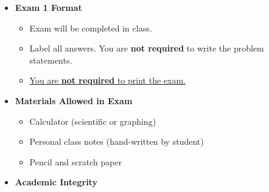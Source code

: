 \documentclass[11pt]{article}
\newcommand{\EXAMNUM}{1\hspace{0mm}}
\begin{document}
\begin{itemize}
             	\item  \textbf{\Large Exam \EXAMNUM \hspace{1mm} Format}
\begin{itemize}
		
			\item Exam will be completed in class.
			
			\item Label all answers. You are {\bf not required} to write the problem statements.
			\item \underline{You are {\bf not required} to print the exam.}
\end{itemize}


\vspace{5mm}		

		\item  \textbf{ Materials Allowed in Exam}

	\begin{itemize}

		\item  Calculator (scientific or graphing)
	
		\item  Personal class notes (hand-written by student)
			
		\item  Pencil and scratch paper
			
	\end{itemize}

\newpage
		\item  \textbf{ \Large Academic Integrity}
\begin{itemize}


\end{itemize}
\end{itemize}
\end{document}
